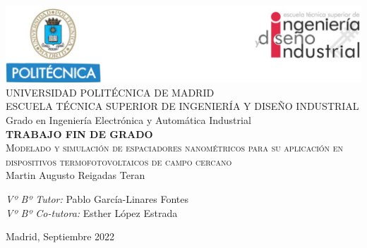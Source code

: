 \begin{titlepage}
\begin{center}
\includegraphics[width=1\textwidth]{figuras/cabecera.png}  \\[0.7 cm]

\LARGE UNIVERSIDAD POLITÉCNICA DE MADRID \\ [1 cm]

\LARGE ESCUELA TÉCNICA SUPERIOR DE INGENIERÍA Y DISEÑO INDUSTRIAL \\ [1 cm]

\LARGE Grado en Ingeniería Electrónica y Automática Industrial\\ [.7 cm]

\LARGE \textbf{TRABAJO FIN DE GRADO}\\[0.7 cm]

\Huge \textsc{Modelado y simulación de espaciadores nanométricos para su aplicación en dispositivos termofotovoltaicos de campo cercano}\\[1 cm]

\LARGE Martin Augusto Reigadas Teran \\[1.5 cm]
\begin{flushleft}
\Large
\emph{Vº Bº Tutor: }{Pablo García-Linares Fontes}\\[.7cm]
\emph{Vº Bº Co-tutora: }Esther López Estrada\\

\end{flushleft}

\vfill

{\large Madrid, Septiembre 2022}
\cleardoublepage 
\end{center}
\end{titlepage}
